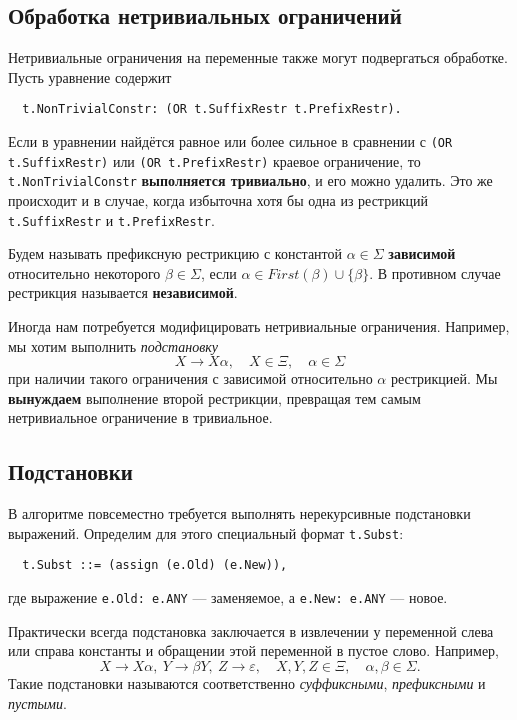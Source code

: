 \documentclass[12pt]{article}
\begin{document}
\subsection{Обработка нетривиальных ограничений}

Нетривиальные ограничения на переменные также могут подвергаться обработке.
Пусть уравнение содержит
\begin{Verbatim}
  t.NonTrivialConstr: (OR t.SuffixRestr t.PrefixRestr).
\end{Verbatim}
Если в уравнении найдётся равное или более сильное в сравнении с
\texttt{(OR t.SuffixRestr)} или \texttt{(OR t.PrefixRestr)} краевое
ограничение, то \texttt{t.NonTrivialConstr} \textbf{выполняется тривиально},
и его можно удалить. Это же происходит и в случае, когда избыточна хотя
бы одна из рестрикций \texttt{t.SuffixRestr} и \texttt{t.PrefixRestr}.

Будем называть префиксную рестрикцию с константой $\alpha \in \Sigma$
\textbf{зависимой} относительно некоторого $\beta \in \Sigma$, если
$\alpha \in First(\beta) \cup \{\beta\}$. В противном случае рестрикция
называется \textbf{независимой}.

Иногда нам потребуется модифицировать нетривиальные ограничения. Например, мы
хотим выполнить \textit{подстановку}
\begin{displaymath}
  X \to X \alpha, \quad X \in \Xi, \quad \alpha \in \Sigma
\end{displaymath}
при наличии такого ограничения с зависимой относительно $\alpha$ рестрикцией.
Мы \textbf{вынуждаем} выполнение второй рестрикции, превращая тем самым
нетривиальное ограничение в тривиальное.


\subsection{Подстановки}

В алгоритме повсеместно требуется выполнять нерекурсивные подстановки
выражений. Определим для этого специальный формат \texttt{t.Subst}:
\begin{Verbatim}
  t.Subst ::= (assign (e.Old) (e.New)),
\end{Verbatim}
где выражение \texttt{e.Old: e.ANY} --- заменяемое, а \texttt{e.New: e.ANY}
--- новое.

Практически всегда подстановка заключается в извлечении у переменной слева или
справа константы и обращении этой переменной в пустое слово. Например,
\begin{displaymath}
  X \to X \alpha, \ Y \to \beta Y, \ Z \to \varepsilon,
  \quad X, Y, Z \in \Xi,
  \quad \alpha, \beta \in \Sigma.
\end{displaymath}
Такие подстановки называются соответственно \textit{суффиксными},
\textit{префиксными} и \textit{пустыми}.
\end{document}
